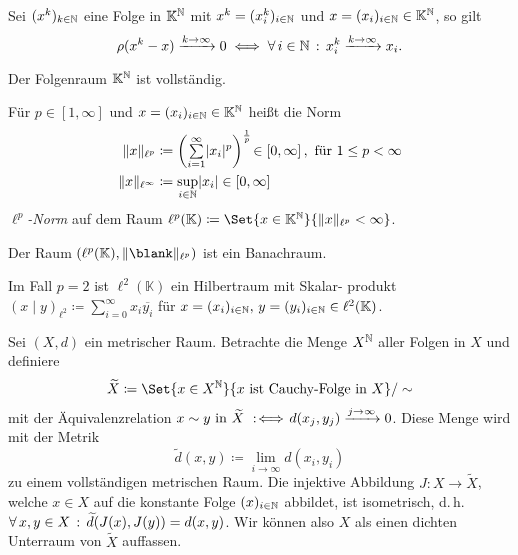 \documentclass{cheat-sheet}
\newcommand{\K}{\mathbb{K}}
\newcommand{\scp}[2]{\left( #1 \!\mid\! #2 \right)} %
\newcommand{\convWith}[1]{\xrightarrow{#1 \to \infty}} %
\begin{document}
\begin{satz}
  Sei $(x^k)_{k \in \mathbb{N}}$ eine Folge in $\K^\N$ mit $x^k = (x^k_i)_{i \in \mathbb{N}}$ und $x = (x_i)_{i \in \N} \in \K^\N$, so gilt
  \[ \rho(x^k - x) \convWith{k} 0 \iff \fa{i \in \N} x_i^k \convWith{k} x_i. \]
\end{satz}

\begin{satz}
  Der Folgenraum $\K^\N$ ist vollständig.
\end{satz}

\begin{defn}
  Für $p \in \left[ 1, \infty \right]$ und $x = (x_i)_{i \in \N} \in \K^\N$ heißt die Norm
  \begin{align*}
    \norm{x}_{\ell^p} &\coloneqq \left( \sum_{i=1}^\infty \abs{x_i}^p \right)^{\frac{1}{p}} \!\in \left[ 0, \infty \right], \text{ für } 1 \leq p < \infty \\
    \norm{x}_{\ell^\infty} &\coloneqq \sup_{i \in \N} \abs{x_i} \in \left[0, \infty\right]
  \end{align*}
  \emph{$\ell^p$-Norm} auf dem Raum $\ell^p(\K) \coloneqq \Set{ x \in \K^\N }{ \norm{x}_{\ell^p} < \infty }$.
\end{defn}

\begin{satz}
  Der Raum $(\ell^p(\K), \norm{\blank}_{\ell^p})$ ist ein Banachraum.
\end{satz}

\begin{bem}
  Im Fall $p {=} 2$ ist $\ell^2(\K)$ ein Hilbertraum mit Skalar- produkt $\scp{x}{y}_{\ell^2} \coloneqq \sum_{i = 0}^\infty x_i \overline{y_i}$ für $x = (x_i)_{i \in \N}, \, y = (y_i)_{i \in \N} \in \ell^2(\K)$.
\end{bem}


\begin{satz}[Vervollständigung]
  Sei $(X, d)$ ein metrischer Raum. Betrachte die Menge $X^{\mathbb{N}}$ aller Folgen in $X$ und definiere
  \[ \widetilde{X} \coloneqq \Set{ x \in X^\N }{ x \text{ ist Cauchy-Folge in } X }/\sim \]
  mit der Äquivalenzrelation $x \sim y \text{ in } \widetilde{X} \!\coloniff\! d(x_j, y_j) \convWith{j} 0$.
  Diese Menge wird mit der Metrik
  \[ \widetilde{d}(x, y) \coloneqq \lim_{i \to \infty} d(x_i, y_i) \]
  zu einem vollständigen metrischen Raum. Die injektive Abbildung $J : X \to \tilde{X}$, welche $x \in X$ auf die konstante Folge $(x)_{i \in \mathbb{N}}$ abbildet, ist isometrisch, d.\,h.
  $\forall \, {x, y \in X} \,:\, \widetilde{d}(J(x), J(y)) = d(x, y)$.
  Wir können also $X$ als einen dichten Unterraum von $\widetilde{X}$ auffassen.
\end{satz}
\end{document}
